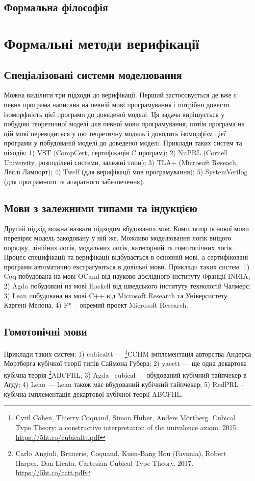 \subsection{Формальна філософія}

\section{Формальні методи верифікації}

\subsection{Спеціалізовані системи моделювання}
Можна виділити три підходи до верифікації.
Перший застосовується де вже є
певна програма написана на певній мові програмування і потрібно довести ізоморфність
цієї програми до доведеної моделі. Ця задача вирішується у побудові теоретичної моделі
для певної мови програмування, потім програма на цій мові переводиться у цю
теоретичну модель і доводить ізоморфізм цієї програми у побудованій моделі до доведеної моделі.
Приклади таких систем та піходів:
1) VST (CompCert, сертифікація C програм);
2) NuPRL (Cornell University, розподілені системи, залежні типи);
3) TLA+ (Microsoft Reseach, Леслі Лампорт);
4) Twelf (для верифікації мов програмування);
5) SystemVerilog (для програмного та апаратного забезпечення).

\subsection{Мови з залежними типами та індукцією}
Другий підхід можна назвати підходом вбудованих мов.
Компілятор основої мови перевіряє модель закодовану у ній же. Можливо моделювання
логік вищого порядку, лінійних логік, модальних логік, категорний та гомотопічних логік.
Процес специфікації та верифікації відбувається в основній мові, а сертифіковані програми
автоматично екстрагуються в довільні мови.
Приклади таких систем:
1) Coq побудована на мові OCaml від науково-дослідного інституту Франції INRIA;
2) Agda побудовані на мові Haskell від шведського інституту технологій Чалмерс;
3) Lean побудована на мові C++ від Microsoft Research та Універсистету Каргені-Мелона;
4) F* -- окремий проект Microsoft Research.

\subsection{Гомотопічні мови}
Приклади таких систем:
1) cubicaltt --- \footnote{Cyril Cohen, Thierry Coquand, Simon Huber, Anders M{\"{o}}rtberg. Cubical Type Theory: a constructive interpretation of the univalence axiom. 2015. \url{https://5ht.co/cubicaltt.pdf}}{CCHM} імплементація авторства Андерса Мортберга кубічної теорії типів Саймона Губера;
2) yacctt --- ще одна декартова кубічна теорія \footnote{Carlo Angiuli, Brunerie, Coquand, Kuen-Bang Hou (Favonia), Robert Harper, Dan Licata. Cartesian Cubical Type Theory. 2017. \url{https://5ht.co/cctt.pdf}}{ABCFHL};
3) Agda --cubical --- вбудований кубічний тайпчекер в Агду;
4) Lean --- Lean також має вбудований кубічний тайпчекер;
5) RedPRL -- кубічна імплементація декартової кубічної теорії ABCFHL.

